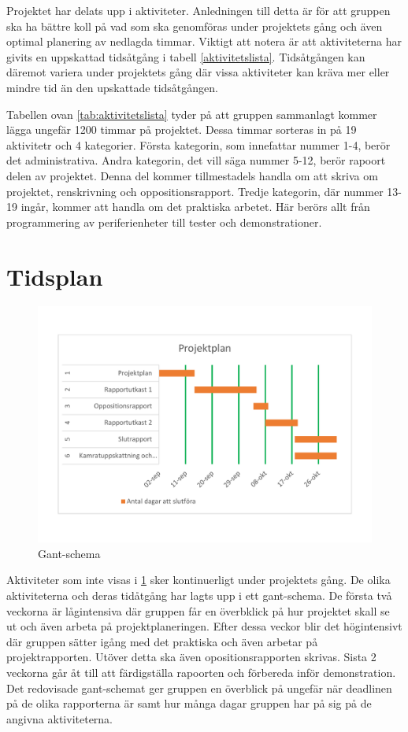 \documentclass[a4paper]{article}
\begin{document}
Projektet har delats upp i aktiviteter. Anledningen till detta är för att gruppen ska ha bättre koll på vad som ska genomföras under projektets gång och även optimal planering av nedlagda timmar. Viktigt att notera är att aktiviteterna har givits en uppskattad tidsåtgång i tabell \ref{aktivitetslista}. Tidsåtgången kan däremot variera under projektets gång där vissa aktiviteter kan kräva mer eller mindre tid än den upskattade tidsåtgången.

Tabellen ovan \ref{tab:aktivitetslista} tyder på att gruppen sammanlagt kommer lägga ungefär 1200 timmar på projektet. Dessa timmar sorteras in på 19 aktivitetr och 4 kategorier. Första kategorin, som innefattar nummer 1-4, berör det administrativa. Andra kategorin, det vill säga nummer 5-12, berör rapoort delen av projektet. Denna del kommer tillmestadels handla om att skriva om projektet, renskrivning och oppositionsrapport. Tredje kategorin, där nummer 13-19 ingår, kommer att handla om det praktiska arbetet. Här berörs allt från programmering av periferienheter till tester och demonstrationer. 





\section{Tidsplan}
\begin{figure}
    \includegraphics[width=\textwidth]{Gantschema.pdf}
    \caption{Gant-schema}
    \label{fig:Gant}
\end{figure}

Aktiviteter som inte visas i \ref{fig:Gant} sker kontinuerligt under projektets gång. De olika aktiviteterna och deras tidåtgång har lagts upp i ett gant-schema. De första två veckorna är lågintensiva där gruppen får en överbklick på hur projektet skall se ut och även arbeta på projektplaneringen. Efter dessa veckor blir det högintensivt där gruppen sätter igång med det praktiska och även arbetar på projektrapporten. Utöver detta ska även opositionsrapporten skrivas. Sista 2 veckorna går åt till att färdigställa rapoorten och förbereda inför demonstration. Det redovisade gant-schemat ger gruppen en överblick på ungefär när deadlinen på de olika rapporterna är samt hur många dagar gruppen har på sig på de angivna aktiviteterna. 
\end{document}
